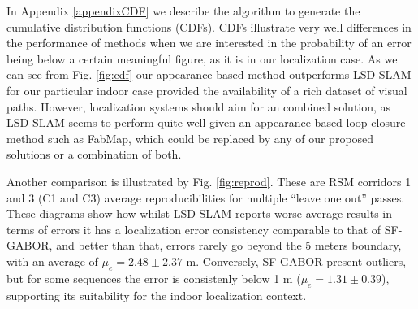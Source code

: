 In Appendix \ref{appendixCDF} we describe the algorithm to generate the cumulative distribution functions (CDFs). CDFs illustrate very well differences in the performance of methods when we are interested in the probability of an error being below a certain  meaningful figure, as it is in our localization case. As we can see from Fig. \ref{fig:cdf} our appearance based method outperforms LSD-SLAM for our particular indoor case provided the availability of a rich dataset of visual paths. However, localization systems should aim for an combined solution, as LSD-SLAM seems to perform quite well given an appearance-based loop closure method \citep{engel14eccv} such as FabMap, which could be replaced by any of our proposed solutions \citep{Rivera-Rubio2015PRL} or a combination of both.

Another comparison is illustrated by Fig. \ref{fig:reprod}. These are RSM corridors 1 and 3 (C1 and C3) average reproducibilities for multiple ``leave one out'' passes. These diagrams show how whilst LSD-SLAM reports worse average results in terms of errors it has a localization error consistency comparable to that of SF-GABOR, and better than that, errors rarely go beyond the 5 meters boundary, with an average of $\mu_e = 2.48 \pm 2.37$ m. Conversely, SF-GABOR present outliers, but for some sequences the error is consistenly below 1 m ($\mu_e = 1.31 \pm 0.39$), supporting its suitability for the indoor localization context.

